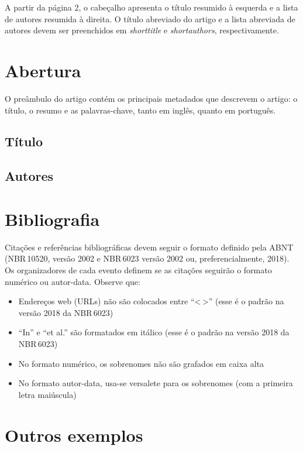 \documentclass[portuguese,notblind]{sbc20}
\begin{document}
A partir da página 2, o cabeçalho apresenta o título resumido à esquerda e a lista de autores resumida à direita. O título abreviado do artigo e a lista abreviada de autores devem ser preenchidos em \textit{shorttitle} e \textit{shortauthors}, respectivamente.

\section{Abertura}

O preâmbulo do artigo contém os principais metadados que descrevem o artigo: o título, o resumo e as palavras-chave, tanto em inglês, quanto em português.

\subsection{Título}

\subsection{Autores}

\section{Bibliografia}

Citações e referências bibliográficas devem seguir o formato definido pela ABNT (NBR\,10520, versão 2002 e NBR\,6023 versão 2002 ou, preferencialmente, 2018). Os organizadores de cada evento definem se as citações seguirão o formato numérico ou autor-data. Observe que:

\begin{itemize}
  \item Endereços web (URLs) não são colocados entre ``<\,>'' (esse é o padrão na versão 2018 da NBR\,6023)
  \item ``In'' e ``et al.'' são formatados em itálico (esse é o padrão na versão 2018 da NBR\,6023)
  \item No formato numérico, os sobrenomes não são grafados em caixa alta
  \item No formato autor-data, usa-se versalete para os sobrenomes (com a primeira letra maiúscula)
\end{itemize}

\section{Outros exemplos}
\end{document}
